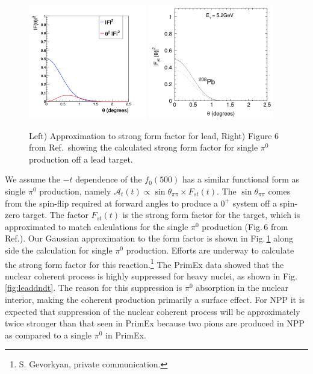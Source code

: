 \begin{figure}[tbh]
\begin{center}
\includegraphics[height=5cm,clip=true]{figures/fit_Primakoff_sigma_c1.png}
\includegraphics[height=5cm,clip=true]{figures/PRC80_2009_Fig6.png}
\caption{ Left) Approximation to strong form factor for lead, Right) Figure 6 from Ref.\,\cite{Gevorkyan:2009ge} showing the calculated strong form factor for single $\pi^0$ production off a lead target.
\label{fig:strongFF}}
\end{center}
\end{figure}

We assume the $-t$ dependence of the $f_0(500)$ has a similar
functional form as single $\pi^0$ production, namely $\mathcal{A}_t(t)
\propto \sin{\theta_{\pi\pi}} \times F_{st}(t)$.  The
$\sin{\theta_{\pi\pi}}$ comes from the spin-flip required at forward
angles to produce a $0^+$ system off a spin-zero target. The factor
$F_{st}(t)$ is the strong form factor for the target, which is
approximated to match calculations for the single $\pi^0$ production
(Fig.\,6 from Ref.\cite{Gevorkyan:2009ge}). Our Gaussian approximation
to the form factor is shown in Fig.\,\ref{fig:strongFF} along side the
calculation for single $\pi^0$ production. Efforts are underway to
calculate the strong form factor for this
reaction.\footnote{S. Gevorkyan, private communication.}  The PrimEx
data showed that the nuclear coherent process is highly suppressed for
heavy nuclei, as shown in Fig.\ref{fig:leaddndt}.  The reason for this
suppression is $\pi^0$ absorption in the nuclear interior, making the
coherent production primarily a surface effect.  For NPP it is
expected that suppression of the nuclear coherent process will be
approximately twice stronger than that seen in PrimEx because two
pions are produced in NPP as compared to a single $\pi^0$ in PrimEx.


